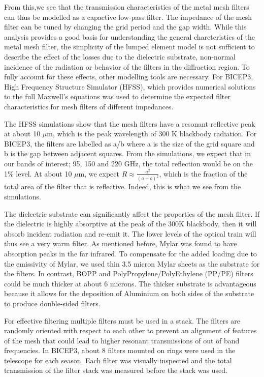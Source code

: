 \documentclass[12pt]{article}
\begin{document}
From this,we see that the transmission characteristics of the metal mesh filters can thus be modelled as a capactive low-pass filter. The impedance of the mesh filter can be tuned by changing the grid period and the gap width. While this analysis provides a good basis for understanding the general charcteristics of the metal mesh filter, the simplicity of the lumped element model is not sufficient to describe the effect of the losses due to the dielectric substrate, non-normal incidence of the radiation or behavior of the filters in the diffraction region. To fully account for these effects, other modelling tools are necessary. For BICEP3, High Frequency Structure Simulator (HFSS), which provides numerical solutions to the full Maxwell's equations was used to determine the expected filter characteristics for mesh filters of different impedances.       

The HFSS simulations show that the mesh filters have a resonant reflective peak at about 10 $\mu$m, which is the peak wavelength of 300 K blackbody radiation. For BICEP3, the filters are labelled as a/b where a is the size of the grid square and b is the gap between adjacent squares. From the simulations, we expect that in our bands of interest; 95, 150 and 220 GHz, the total reflection would be on the 1\% level. At about 10 $\mu$m, we expect $R \approx \frac{a^2}{(a + b)^2}$, which is the fraction of the total area of the filter that is reflective. Indeed, this is what we see from the simulations.

The dielectric substrate can significantly affect the properties of the mesh filter. If the dielectric is highly absorptive at the peak of the 300K blackbody, then it will absorb incident radiation and re-emit it. The lower levels of the optical train will thus see a very warm filter. As mentioned before, Mylar was found to have absorption peaks in the far infrared. To compensate for the added loading due to the emissivity of Mylar, we used thin 3.5 micron Mylar sheets as the substrate for the filters. In contrast, BOPP and PolyPropylene/PolyEthylene (PP/PE) filters could be much thicker at about 6 microns. The thicker substrate is advantageous because it allows for the deposition of Aluminium on both sides of the substrate to produce double-sided filters. 

For effective filtering multiple filters must be used in a stack. The filters are randomly oriented with respect to each other to prevent an alignment of features of the mesh that could lead to higher resonant transmissions of out of band frequencies. In BICEP3, about 8 filters mounted on rings were used in the telescope for each season. Each filter was visually inspected and the total transmission of the filter stack was measured before the stack was used.  
\end{document}
